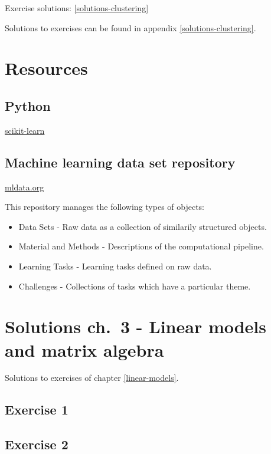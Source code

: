\documentclass[]{book}
\providecommand{\tightlist}{%
  \setlength{\itemsep}{0pt}\setlength{\parskip}{0pt}}
\theoremstyle{definition}
\theoremstyle{definition}
\theoremstyle{definition}
\theoremstyle{remark}
\begin{document}
Exercise solutions: \ref{solutions-clustering}

Solutions to exercises can be found in appendix
\ref{solutions-clustering}.

\appendix


\chapter{Resources}\label{resources}

\section{Python}\label{python}

\href{http://scikit-learn.org}{scikit-learn}

\section{Machine learning data set
repository}\label{machine-learning-data-set-repository}

\href{http://mldata.org/}{mldata.org}

This repository manages the following types of objects:

\begin{itemize}
\tightlist
\item
  Data Sets - Raw data as a collection of similarily structured objects.
\item
  Material and Methods - Descriptions of the computational pipeline.
\item
  Learning Tasks - Learning tasks defined on raw data.
\item
  Challenges - Collections of tasks which have a particular theme.
\end{itemize}

\chapter{Solutions ch.~3 - Linear models and matrix
algebra}\label{solutions-linear-models}

Solutions to exercises of chapter \ref{linear-models}.

\section{Exercise 1}\label{exercise-1}

\section{Exercise 2}\label{exercise-2}
\end{document}
